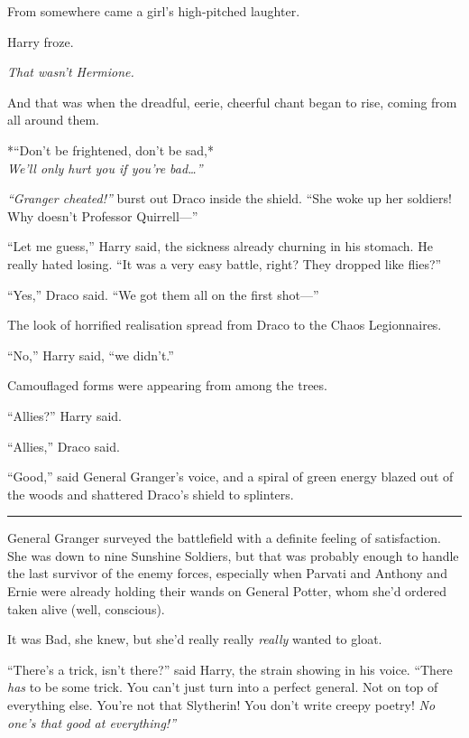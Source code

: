 From somewhere came a girl's high-pitched laughter.

Harry froze.

\emph{That wasn't Hermione.}

And that was when the dreadful, eerie, cheerful chant began to rise,
coming from all around them.

*``Don't be frightened, don't be sad,*\\\emph{We'll only hurt you if
you're bad\ldots{}''}

\emph{``Granger cheated!''} burst out Draco inside the shield. ``She
woke up her soldiers! Why doesn't Professor Quirrell---''

``Let me guess,'' Harry said, the sickness already churning in his
stomach. He really hated losing. ``It was a very easy battle, right?
They dropped like flies?''

``Yes,'' Draco said. ``We got them all on the first shot---''

The look of horrified realisation spread from Draco to the Chaos
Legionnaires.

``No,'' Harry said, ``we didn't.''

Camouflaged forms were appearing from among the trees.

``Allies?'' Harry said.

``Allies,'' Draco said.

``Good,'' said General Granger's voice, and a spiral of green energy
blazed out of the woods and shattered Draco's shield to splinters.

\begin{center}\rule{3in}{0.4pt}\end{center}

General Granger surveyed the battlefield with a definite feeling of
satisfaction. She was down to nine Sunshine Soldiers, but that was
probably enough to handle the last survivor of the enemy forces,
especially when Parvati and Anthony and Ernie were already holding their
wands on General Potter, whom she'd ordered taken alive (well,
conscious).

It was Bad, she knew, but she'd really really \emph{really} wanted to
gloat.

``There's a trick, isn't there?'' said Harry, the strain showing in his
voice. ``There \emph{has} to be some trick. You can't just turn into a
perfect general. Not on top of everything else. You're not that
Slytherin! You don't write creepy poetry! \emph{No one's that good at
everything!''}

